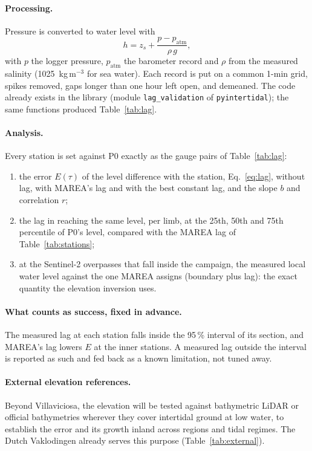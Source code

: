 \documentclass[11pt,a4paper]{article}
\begin{document}
\paragraph{Processing.} Pressure is converted to water level with
\begin{equation}
h = z_s + \frac{p - p_{\mathrm{atm}}}{\rho\, g},
\end{equation}
with $p$ the logger pressure, $p_{\mathrm{atm}}$ the barometer record and
$\rho$ from the measured salinity (1025~kg\,m$^{-3}$ for sea water). Each
record is put on a common 1-min grid, spikes removed, gaps longer than
one hour left open, and demeaned. The code already exists in the library
(module \texttt{lag\_validation} of \texttt{pyintertidal}); the same
functions produced Table~\ref{tab:lag}.

\paragraph{Analysis.} Every station is set against P0 exactly as the
gauge pairs of Table~\ref{tab:lag}:
\begin{enumerate}
\item the error $E(\tau)$ of the level difference with the station,
  Eq.~\eqref{eq:lag}, without lag, with MAREA's lag and with the best
  constant lag, and the slope $b$ and correlation $r$;
\item the lag in reaching the same level, per limb, at the 25th, 50th and
  75th percentile of P0's level, compared with the MAREA lag of
  Table~\ref{tab:stations};
\item at the Sentinel-2 overpasses that fall inside the campaign, the
  measured local water level against the one MAREA assigns (boundary plus
  lag): the exact quantity the elevation inversion uses.
\end{enumerate}

\paragraph{What counts as success, fixed in advance.} The measured lag at
each station falls inside the 95\,\% interval of its section, and MAREA's
lag lowers $E$ at the inner stations. A measured lag outside the interval
is reported as such and fed back as a known limitation, not tuned away.

\paragraph{External elevation references.} Beyond Villaviciosa, the
elevation will be tested against bathymetric LiDAR or official
bathymetries wherever they cover intertidal ground at low water, to
establish the error and its growth inland across regions and tidal
regimes. The Dutch Vaklodingen already serves this purpose
(Table~\ref{tab:external}).
\end{document}
